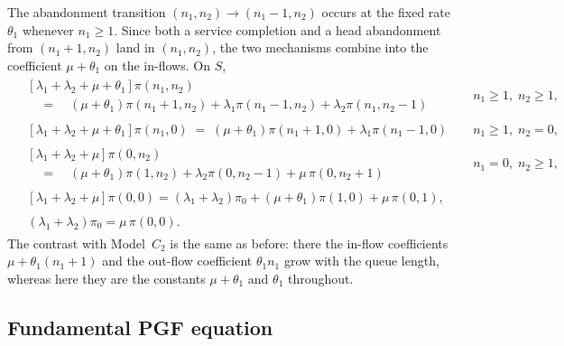 The abandonment transition $(n_1,n_2)\to(n_1-1,n_2)$ occurs at the fixed rate $\theta_1$
whenever $n_1\ge1$. Since both a service completion and a head abandonment from
$(n_1+1,n_2)$ land in $(n_1,n_2)$, the two mechanisms combine into the coefficient
$\mu+\theta_1$ on the in-flows. On $S$,
\begin{align}
    \begin{split}
        &\left[\lambda_1+\lambda_2+\mu+\theta_1\right]\pi(n_1,n_2) \\
        &\quad=\quad (\mu+\theta_1)\pi(n_1+1,n_2)
          +\lambda_1\pi(n_1-1,n_2)
          +\lambda_2\pi(n_1,n_2-1)
    \end{split}
    &&n_1\ge1,\;n_2\ge1, \label{eq:C21:interior} \\
    \begin{split}
        &\left[\lambda_1+\lambda_2+\mu+\theta_1\right]\pi(n_1,0)
          \;=\; (\mu+\theta_1)\pi(n_1+1,0)
          +\lambda_1\pi(n_1-1,0)
    \end{split}
    &&n_1\ge1,\;n_2=0, \label{eq:C21:xboundary} \\
    \begin{split}
        &\left[\lambda_1+\lambda_2+\mu\right]\pi(0,n_2) \\
        &\quad=\quad (\mu+\theta_1)\pi(1,n_2)
          +\lambda_2\pi(0,n_2-1)
          +\mu\,\pi(0,n_2+1)
    \end{split}
    &&n_1=0,\;n_2\ge1, \label{eq:C21:yboundary} \\
    \begin{split}
        &\left[\lambda_1+\lambda_2+\mu\right]\pi(0,0)
          = (\lambda_1+\lambda_2)\pi_0
          + (\mu+\theta_1)\pi(1,0)
          + \mu\,\pi(0,1),
    \end{split} &&\label{eq:C21:zero} \\
    \begin{split}
        &(\lambda_1+\lambda_2)\pi_0 = \mu\,\pi(0,0).
    \end{split} &&\label{eq:C21:idle}
\end{align}
The contrast with Model~$C_2$ is the same as before: there the in-flow coefficients
$\mu+\theta_1(n_1+1)$ and the out-flow coefficient $\theta_1 n_1$ grow with the queue
length, whereas here they are the constants $\mu+\theta_1$ and $\theta_1$ throughout.

\subsection{Fundamental PGF equation}

